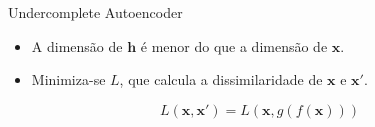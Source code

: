 \documentclass[dvipsnames]{beamer}
\begin{document}
\begin{frame}{Undercomplete Autoencoder}

	\justifying

	\begin{itemize}
		\item A dimensão de $\boldsymbol{h}$ é menor do que a dimensão de $\boldsymbol{x}$.
		\item Minimiza-se $L$, que calcula a dissimilaridade de $\boldsymbol{x}$ e $\boldsymbol{x'}$.
	\end{itemize}

	\begin{equation*}
		L(\boldsymbol{x}, \boldsymbol{x'}) = L(\boldsymbol{x}, g(f(\boldsymbol{x})))
	\end{equation*}

\end{frame}
\end{document}
